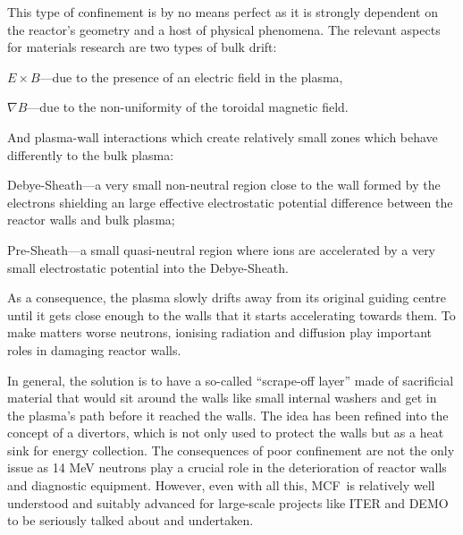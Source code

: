 \documentclass[12pt, a4paper]{article}
\newcommand{\mc}{MCF}
\begin{document}
			This type of confinement is by no means perfect as it is strongly dependent on the reactor's geometry and a host of physical phenomena. The relevant aspects for materials research are two types of bulk drift:
			\begin{inparaenum}
				\item $E \times B$---due to the presence of an electric field in the plasma,
				\item $\nabla B$---due to the non-uniformity of the toroidal magnetic field.
			\end{inparaenum}
			And plasma-wall interactions which create relatively small zones which behave differently to the bulk plasma:
			\begin{inparaenum}
				\item Debye-Sheath---a very small non-neutral region close to the wall formed by the electrons shielding an large effective electrostatic potential difference between the reactor walls and bulk plasma;
				\item Pre-Sheath---a small quasi-neutral region where ions are accelerated by a very small electrostatic potential into the Debye-Sheath.
			\end{inparaenum}
			As a consequence, the plasma slowly drifts away from its original guiding centre until it gets close enough to the walls that it starts accelerating towards them. To make matters worse neutrons, ionising radiation and diffusion play important roles in damaging reactor walls.
			
			In general, the solution is to have a so-called ``scrape-off layer'' made of sacrificial material that would sit around the walls like small internal washers and get in the plasma's path before it reached the walls. The idea has been refined into the concept of a divertors, which is not only used to protect the walls but as a heat sink for energy collection. The consequences of poor confinement are not the only issue as 14 MeV neutrons play a crucial role in the deterioration of reactor walls and diagnostic equipment. However, even with all this, \mc~is relatively well understood and suitably advanced for large-scale projects like ITER and DEMO to be seriously talked about and undertaken.
\end{document}
